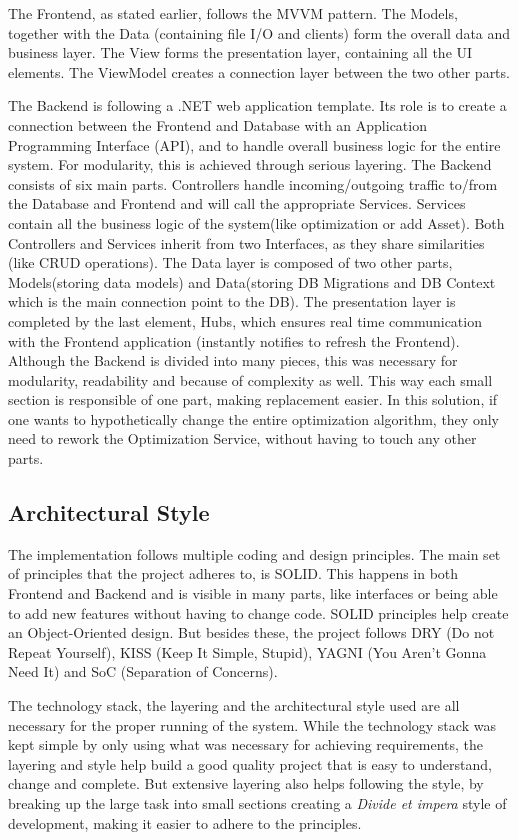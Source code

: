 \hspace*{1cm}The Frontend, as stated earlier, follows the MVVM pattern. The Models, together with the Data (containing file I/O and clients) form the overall data and business layer. The View forms the presentation layer, containing all the UI elements. The ViewModel creates a connection layer between the two other parts. 

\hspace*{1cm}The Backend is following a .NET web application template. Its role is to create a connection between the Frontend and Database with an Application Programming Interface (API), and to handle overall business logic for the entire system. For modularity, this is achieved through serious layering. The Backend consists of six main parts. Controllers handle incoming/outgoing traffic to/from the Database and Frontend and will call the appropriate Services. Services contain all the business logic of the system(like optimization or add Asset). Both Controllers and Services inherit from two Interfaces, as they share similarities (like CRUD operations). The Data layer is composed of two other parts, Models(storing data models) and Data(storing DB Migrations and DB Context which is the main connection point to the DB). The presentation layer is completed by the last element, Hubs, which ensures real time communication with the Frontend application (instantly notifies to refresh the Frontend). Although the Backend is divided into many pieces, this was necessary for modularity, readability and because of complexity as well. This way each small section is responsible of one part, making replacement easier. In this solution, if one wants to hypothetically change the entire optimization algorithm, they only need to rework the Optimization Service, without having to touch any other parts.

\subsection*{Architectural Style}

\hspace*{1cm}The implementation follows multiple coding and design principles. The main set of principles that the project adheres to, is SOLID. This happens in both Frontend and Backend and is visible in many parts, like interfaces or being able to add new features without having to change code. SOLID principles help create an Object-Oriented design. But besides these, the project follows DRY (Do not Repeat Yourself), KISS  (Keep It Simple, Stupid), YAGNI (You Aren't Gonna Need It) and SoC (Separation of Concerns).

\hspace*{1cm}The technology stack, the layering and the architectural style used are all necessary for the proper running of the system. While the technology stack was kept simple by only using what was necessary for achieving requirements, the layering and style help build a good quality project that is easy to understand, change and complete. But extensive layering also helps following the style, by breaking up the large task into small sections creating a \textit{Divide et impera} style of development, making it easier to adhere to the principles.  


